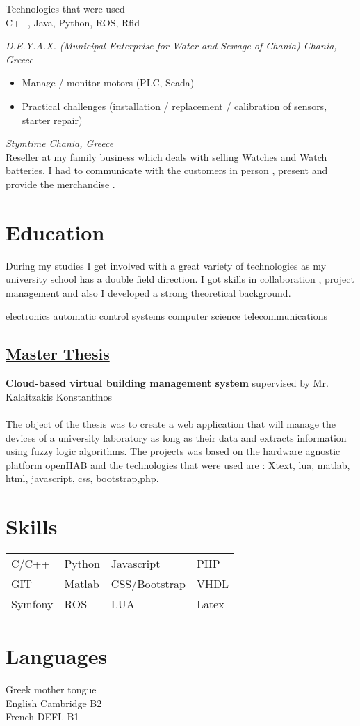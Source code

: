 \documentclass{my_cv}
\begin{document}
Technologies that were used
\\
C++, Java, Python, ROS, Rfid

\textit{D.E.Y.A.X. (Municipal Enterprise for Water and Sewage of Chania)  Chania,  Greece}
\\
\begin{itemize}
	\item Manage / monitor motors (PLC, Scada)
	\item Practical challenges (installation / replacement / calibration of sensors, starter repair)

\end{itemize}%

\textit{Stymtime  Chania,  Greece}
\\
Reseller at my family business​ which deals with selling Watches and Watch
batteries. I had to communicate with the customers  in person , present and
provide the merchandise .


\section{Education}
During my studies I get involved with a great variety of technologies as my university school
has a double field direction. I got skills in collaboration ,
project management and also I developed a strong theoretical background.


\studyitems
{electronics}
{automatic control systems}
{computer science}
{telecommunications}

	
\subsection{\underline{Master Thesis}}
\textbf {\large{Cloud-based virtual building management system}}
supervised by Mr. Kalaitzakis Konstantinos
\\
\\
The object of the thesis was to create a web application  that will manage the
devices of a university laboratory as long as their data and extracts information
using fuzzy logic algorithms. The projects was based on the hardware agnostic
platform openHAB and the technologies that were used are : Xtext, lua, matlab,
html, javascript, css, bootstrap,php.	
	
 	\section{Skills}
 	\begin{tabular}{l l l l}
 		C/C++ & Python & Javascript & PHP \\
 		GIT & Matlab & CSS/Bootstrap & VHDL\\
 		Symfony & ROS & LUA & Latex
 	\end{tabular}
 
\section{Languages}
Greek mother tongue\\ English  Cambridge B2\\ French DEFL B1  
\end{document}
